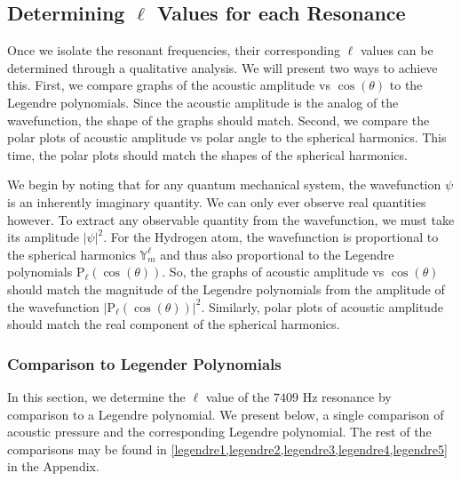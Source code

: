 \documentclass[12pt]{article}
\newcommand{\Ylm}[2]{\mathbb{Y}^{#1}_{#2}}
\begin{document}
	
		
	
	\subsection{Determining $\ell$ Values for each Resonance}
	Once we isolate the resonant frequencies, their corresponding $\ell$ values can be determined through a qualitative analysis. We will present two ways to achieve this. First, we compare graphs of the acoustic amplitude vs $\cos(\theta)$ to the Legendre polynomials. Since the acoustic amplitude is the analog of the wavefunction, the shape of the graphs should match. Second, we compare the polar plots of acoustic amplitude vs polar angle to the spherical harmonics. This time, the polar plots should match the shapes of the spherical harmonics.
	
	We begin by noting that for any quantum mechanical system, the wavefunction $\psi$ is an inherently imaginary quantity. We can only ever observe real quantities however. To extract any observable quantity from the wavefunction, we must take its amplitude $|\psi|^2$. For the Hydrogen atom, the wavefunction is proportional to the spherical harmonics $\Ylm{\ell}{m}$ and thus also proportional to the Legendre polynomials $\mathrm{P}_\ell(\cos(\theta))$. So, the graphs of acoustic amplitude vs $\cos(\theta)$ should match the magnitude of the Legendre polynomials from the amplitude of the wavefunction $|\mathrm{P}_\ell(\cos(\theta))|^2$. Similarly, polar plots of acoustic amplitude should match the real component of the spherical harmonics.
	

	\subsubsection{Comparison to Legender Polynomials}
	In this section, we determine the $\ell$ value of the $7409$ Hz resonance by comparison to a Legendre polynomial. We present below, a single comparison of acoustic pressure and the corresponding Legendre polynomial. The rest of the comparisons may be found in \cref{legendre1,legendre2,legendre3,legendre4,legendre5} in the Appendix.
	
\end{document}
